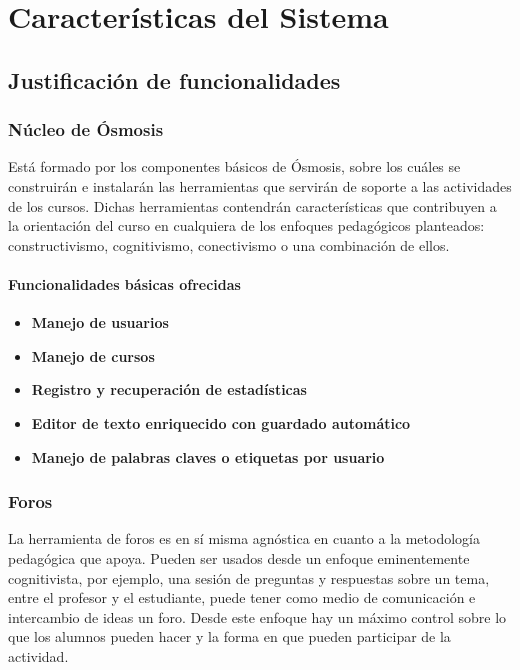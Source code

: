 \chapter{Características del Sistema}
\section{Justificación de funcionalidades}

\subsection{Núcleo de Ósmosis}
Está formado por los componentes básicos de Ósmosis, sobre los cuáles se construirán e instalarán las herramientas que servirán de soporte a las actividades de los cursos. Dichas herramientas contendrán características que contribuyen a la orientación del curso en cualquiera de los enfoques pedagógicos planteados: constructivismo, cognitivismo, conectivismo o una combinación de ellos.

\subsubsection*{Funcionalidades básicas ofrecidas}
\begin{itemize}
	\item \textbf{Manejo de usuarios}
	\item \textbf{Manejo de cursos}
	\item \textbf{Registro y recuperación de estadísticas}
	\item \textbf{Editor de texto enriquecido con guardado automático}
	\item \textbf{Manejo de palabras claves o etiquetas por usuario}
\end{itemize}

\subsection{Foros}

La herramienta de foros es en sí misma agnóstica en cuanto a la metodología pedagógica que apoya. Pueden ser usados desde un enfoque eminentemente cognitivista, por ejemplo, una sesión de preguntas y respuestas sobre un tema, entre el profesor y el estudiante, puede tener como medio de comunicación e intercambio de ideas un foro. Desde este enfoque hay un máximo control sobre lo que los alumnos pueden hacer y la forma en que pueden participar de la actividad.

